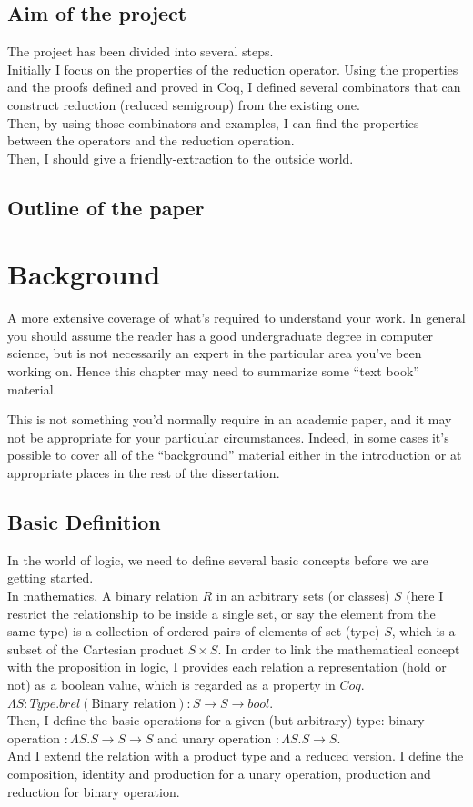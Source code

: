 \documentclass[a4paper,12pt,twoside,openright]{report}
\begin{document}
\section{Aim of the project}
The project has been divided into several steps.\\
Initially I focus on the properties of the reduction operator. Using the properties and the proofs defined and proved in Coq, I defined several combinators that can construct reduction (reduced semigroup) from the existing one.\\
Then, by using those combinators and examples, I can find the properties between the operators and the reduction operation.\\
Then, I should give a friendly-extraction to the outside world.
\section{Outline of the paper}


\chapter{Background} 

A more extensive coverage of what's required to understand your 
work. In general you should assume the reader has a good undergraduate 
degree in computer science, but is not necessarily an expert in 
the particular area you've been working on. Hence this chapter 
may need to summarize some ``text book'' material. 

This is not something you'd normally require in an academic paper, 
and it may not be appropriate for your particular circumstances. 
Indeed, in some cases it's possible to cover all of the ``background'' 
material either in the introduction or at appropriate places in 
the rest of the dissertation. 

\section{Basic Definition}
In the world of logic, we need to define several basic concepts before we are getting started.\\
In mathematics, A binary relation $R$ in an arbitrary sets (or classes) $S$ (here I restrict the relationship to be inside a single set, or say the element from the same type) is a collection of ordered pairs of elements of set (type) $S$, which is a subset of the Cartesian product $S \times S$. In order to link the mathematical concept with the proposition in logic, I provides each relation a representation (hold or not) as a boolean value, which is regarded as a property in $Coq$. $\Lambda S: Type. brel(\text{Binary relation}) : S \rightarrow S \rightarrow bool$. \\
Then, I define the basic operations for a given (but arbitrary) type: binary operation $: \Lambda S.S \rightarrow S \rightarrow S$ and unary operation $: \Lambda S.S \rightarrow S$. \\
And I extend the relation with a product type and a reduced version. I define the composition, identity and production for a unary operation, production and reduction for binary operation. 
\end{document}
